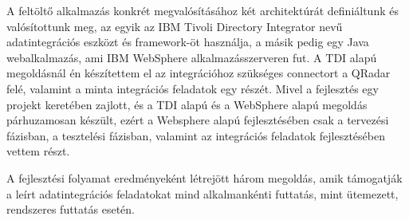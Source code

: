 A feltöltő alkalmazás konkrét megvalósításához két architektúrát definiáltunk és valósítottunk meg, az egyik az IBM Tivoli Directory Integrator nevű adatintegrációs eszközt és framework-öt használja, a másik pedig egy Java webalkalmazás, ami IBM WebSphere alkalmazásszerveren fut. A TDI alapú megoldásnál én készítettem el az integrációhoz szükséges connectort a QRadar felé, valamint a minta integrációs feladatok egy részét.  Mivel a fejlesztés egy projekt keretében zajlott, és a TDI alapú és a WebSphere alapú megoldás párhuzamosan készült, ezért a Websphere alapú fejlesztésében csak a tervezési fázisban, a tesztelési fázisban, valamint az integrációs feladatok fejlesztésében vettem részt.

A fejlesztési folyamat eredményeként létrejött három megoldás, amik támogatják a leírt adatintegrációs feladatokat mind alkalmankénti futtatás, mint ütemezett, rendszeres futtatás esetén.